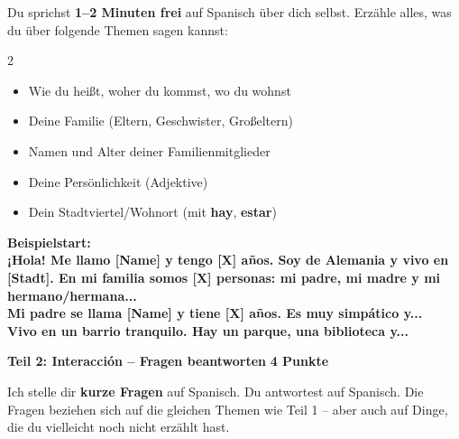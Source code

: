 \documentclass[11pt, a4paper]{article}
\newcommand{\seriftext}[1]{{\fontfamily{ppl}\selectfont #1}}
\newcommand{\es}[1]{\seriftext{\textbf{#1}}}
\newcommand{\teil}[2]{\noindent\textbf{\large Teil #1: #2}}
\begin{document}
Du sprichst \textbf{1--2 Minuten frei} auf Spanisch über dich selbst. Erzähle alles, was du über folgende Themen sagen kannst:

\begin{multicols}{2}
\begin{itemize}[leftmargin=1.5em, itemsep=2pt]
    \item Wie du heißt, woher du kommst, wo du wohnst
    \item Deine Familie (Eltern, Geschwister, Großeltern)
    \item Namen und Alter deiner Familienmitglieder
    \item Deine Persönlichkeit (Adjektive)
    \item Dein Stadtviertel/Wohnort (mit \es{hay}, \es{estar})
\end{itemize}
\end{multicols}

\begin{beispielbox}
\textbf{Beispielstart:}\\[4pt]
\es{¡Hola! Me llamo [Name] y tengo [X] años. Soy de Alemania y vivo en [Stadt]. En mi familia somos [X] personas: mi padre, mi madre y mi hermano/hermana...}\\[4pt]
\es{Mi padre se llama [Name] y tiene [X] años. Es muy simpático y...}\\[4pt]
\es{Vivo en un barrio tranquilo. Hay un parque, una biblioteca y...}
\end{beispielbox}

\vspace{6pt}


\teil{2}{Interacción -- Fragen beantworten} \hfill \textbf{4 Punkte}

\vspace{4pt}

Ich stelle dir \textbf{kurze Fragen} auf Spanisch. Du antwortest auf Spanisch. Die Fragen beziehen sich auf die gleichen Themen wie Teil 1 -- aber auch auf Dinge, die du vielleicht noch nicht erzählt hast.
\end{document}
